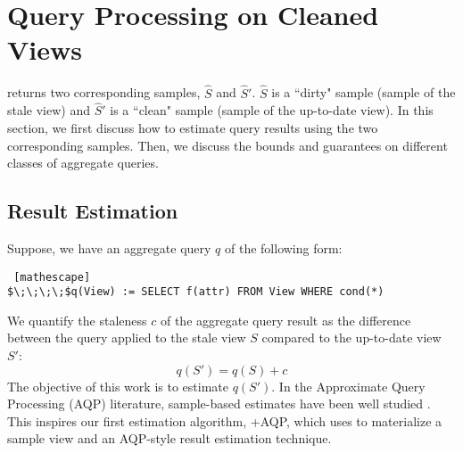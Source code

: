\section{Query Processing on Cleaned Views}
\label{correction}
\svc returns two corresponding samples, $\widehat{S}$ and $\widehat{S}'$.
$\widehat{S}$ is a ``dirty" sample (sample of the stale view) and $\widehat{S}'$ is a ``clean" sample (sample of the up-to-date view).
In this section, we first discuss how to estimate query results using the two corresponding samples. 
Then, we discuss the bounds and guarantees on different classes of aggregate queries.





\subsection{Result Estimation}\label{re}
Suppose, we have an aggregate query $q$ of the following form:
\begin{lstlisting} [mathescape]
$\;\;\;\;$q(View) := SELECT f(attr) FROM View WHERE cond(*)
\end{lstlisting}
We quantify the staleness $c$ of the aggregate query result as the difference
between the query applied to the stale view $S$ compared to the up-to-date view $S'$:
\[
q(S') = q(S) + c
\]
The objective of this work is to estimate $q(S')$.
In the Approximate Query Processing (AQP) literature, sample-based estimates have been well studied \cite{OlkenR86, AgarwalMPMMS13}.
This inspires our first estimation algorithm, \svcnospace+AQP, which uses \svc to materialize a sample view and an AQP-style
result estimation technique.

